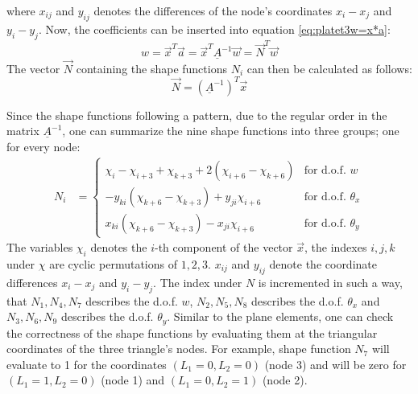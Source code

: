   where $x_{ij}$ and $y_{ij}$ denotes the differences of the node's coordinates $x_i-x_j$ and $y_i-y_j$.
  Now, the coefficients can be inserted into equation \ref{eq:platet3w=x*a}:
  \begin{equation}\label{eq:w=NT*vecw}
  w = \vec{x}^T \vec{a} = \vec{x}^T \underline{A}^{-1} \vec{w} = \vec{N}^T \vec{w}
  \end{equation}
  The vector $\vec{N}$ containing the shape functions $N_i$ can then be calculated as follows:
  \begin{equation}
  \vec{N} = \left(\underline{A}^{-1}\right)^T \vec{x}
  \end{equation}
  
  Since the shape functions following a pattern, due to the regular order in the matrix $\underline{A}^{-1}$, one can summarize the nine shape functions into three groups; one for every node:
  \begin{align}
  N_i &= \begin{cases}
  \chi_i - \chi_{i+3} + \chi_{k+3} + 2\left(\chi_{i+6} - \chi_{k+6}\right) & \text{for d.o.f. } w\\
  -y_{ki}\left(\chi_{k+6} - \chi_{k+3}\right) + y_{ji} \chi_{i+6} & \text{for d.o.f. } \theta_x\\
  x_{ki}\left(\chi_{k+6} - \chi_{k+3}\right) - x_{ji} \chi_{i+6} & \text{for d.o.f. } \theta_y
  \end{cases}
  \end{align}
  The variables $\chi_i$ denotes the $i$-th component of the vector $\vec{x}$, the indexes $i,j,k$ under $\chi$ are cyclic permutations of $1,2,3$. $x_{ij}$ and $y_{ij}$ denote the coordinate differences $x_i - x_j$ and $y_i - y_j$. The index under $N$ is incremented in such a way, that $N_1, N_4, N_7$ describes the d.o.f. $w$, $N_2, N_5, N_8$ describes the d.o.f. $\theta_x$ and $N_3, N_6, N_9$ describes the d.o.f. $\theta_y$.
  Similar to the plane elements, one can check the correctness of the shape functions by evaluating them at the triangular coordinates of the three triangle's nodes. For example, shape function $N_7$ will evaluate to 1 for the coordinates $(L_1 = 0, L_2 = 0)$ (node 3) and will be zero for $(L_1 = 1, L_2 = 0)$ (node 1) and $(L_1 = 0, L_2 = 1)$ (node 2).
  
